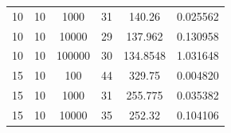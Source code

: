 \documentclass[11pt,a4paper]{report}
\begin{document}
\begin{table}[H]
{\begin{tabular}{c|c|c|c|c|c}
10                                                                                   & 10                                                                                     & 1000                                                                      & 31                                                                                        & 140.26                                                                    & 0.025562              \\
10                                                                                   & 10                                                                                     & 10000                                                                     & 29                                                                                        & 137.962                                                                   & 0.130958              \\
10                                                                                   & 10                                                                                     & 100000                                                                    & 30                                                                                        & 134.8548                                                                  & 1.031648              \\ \hline
15                                                                                   & 10                                                                                     & 100                                                                       & 44                                                                                        & 329.75                                                                    & 0.004820              \\
15                                                                                   & 10                                                                                     & 1000                                                                      & 31                                                                                        & 255.775                                                                   & 0.035382              \\
15                                                                                   & 10                                                                                     & 10000                                                                     & 35                                                                                        & 252.32                                                                    & 0.104106              \\

\end{tabular}}
\end{table}
\end{document}
